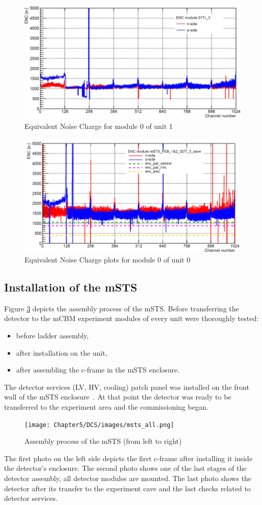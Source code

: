 \begin{figure}[h!]
\centering
\includegraphics[width=0.6\columnwidth]{Chapter5/DCS/images/U0M1_ENC.jpg}
\caption{Equivalent Noise Charge for module 0 of unit 1~\cite{RodriguezRodriguez2020}}
\label{fig_msts_ENC1}
\end{figure}

\begin{figure}[h!]
\centering
\includegraphics[width=0.6\columnwidth]{Chapter5/DCS/images/U1M1_ENC.png}
\caption{Equivalent Noise Charge plots for module 0 of unit 0~\cite{RodriguezRodriguez2020}}
\label{fig_msts_ENC2}
\end{figure}
\newpage
\subsection{Installation of the mSTS}
Figure \ref{fig_msts_state} depicts the assembly process of the \gls{mSTS}. Before transferring the detector to the \gls{mCBM} experiment modules of every unit were thoroughly tested:
\begin{itemize}
    \item before ladder assembly,
    \item after installation on the unit,
    \item after assembling the c-frame in the mSTS enclosure.
\end{itemize}
The detector services (\gls{LV}, \gls{HV}, cooling) patch panel was installed on the front wall of the \gls{mSTS} enclosure~\cite{tekli1}. At that point the detector was ready to be transferred to the experiment area and the commissioning began.

\begin{figure}[h!]
\centering
\texttt{[image: Chapter5/DCS/images/msts\_all.png]}
\caption{Assembly process of the \gls{mSTS} (from left to right)}
\label{fig_msts_state}
\end{figure}
 The first photo on the left side depicts the first c-frame after installing it inside the detector's enclosure. The second photo shows one of the last stages of the detector assembly, all detector modules are mounted. The last photo shows the detector after its transfer to the experiment cave and the last checks related to detector services. %

